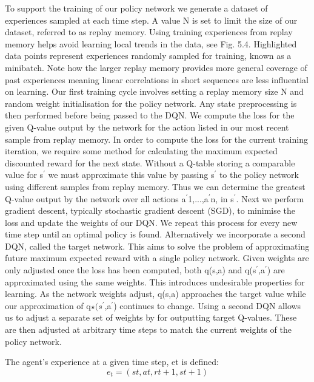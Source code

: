 \documentclass[runningheads]{llncs}
\begin{document}
To support the training of our policy network we generate a dataset of experiences
sampled at each time step. A value N is set to limit the size of our dataset, referred
to as replay memory. Using training experiences from replay memory helps avoid learning local trends in
the data, see Fig. 5.4. Highlighted data points represent experiences randomly sampled
for training, known as a minibatch. Note how the larger replay memory provides more
general coverage of past experiences meaning linear correlations in short sequences are
less influential on learning. Our first training cycle involves setting a replay memory size
N and random weight initialisation for the policy network. Any state preprocessing is then
performed before being passed to the DQN. We compute the loss for the given Q-value
output by the network for the action listed in our most recent sample from replay memory.
In order to compute the loss for the current training iteration, we require some method for
calculating the maximum expected discounted reward for the next state. Without a Q-table
storing a comparable value for s$^{\prime}$ we must approximate this value by passing s$^{\prime}$ to the
policy network using different samples from replay memory. Thus we can determine the
greatest Q-value output by the network over all actions a$^{\prime}$1,...,a$^{\prime}$n, in s$^{\prime}$. Next we perform gradient descent, typically stochastic gradient descent (SGD), to minimise the loss and
update the weights of our DQN. We repeat this process for every new time step until an
optimal policy is found. Alternatively we incorporate a second DQN, called the target network. This aims to
solve the problem of approximating future maximum expected reward with a single policy
network. Given weights are only adjusted once the loss has been computed, both q(s,a)
and q(s$^{\prime}$,a$^{\prime}$) are approximated using the same weights. This introduces undesirable properties for learning. As the network weights adjust, q(s,a) approaches the target value
while our approximation of q$\star(s^{\prime}$,a$^{\prime}$) continues to change. Using a second DQN allows
us to adjust a separate set of weights by for outputting target Q-values. These are then
adjusted at arbitrary time steps to match the current weights of the policy network.

\begin{theorem}
	The agent’s experience at a given time step, et is
	defined:
	\begin{equation}
	e_{t} = (st,at,rt+1,st+1)
	\end{equation}
\end{theorem}
\end{document}
